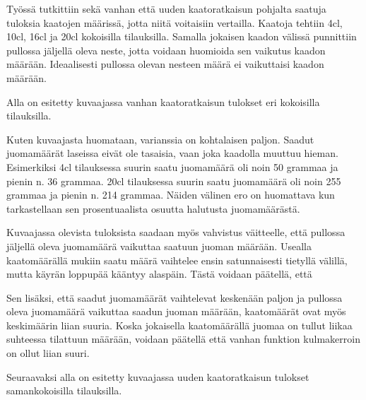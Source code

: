 Työssä tutkittiin sekä vanhan että uuden kaatoratkaisun pohjalta saatuja tuloksia kaatojen määrissä, jotta niitä voitaisiin vertailla. Kaatoja tehtiin 4cl, 10cl, 16cl ja 20cl kokoisilla tilauksilla. Samalla jokaisen kaadon välissä punnittiin pullossa jäljellä oleva neste, jotta voidaan huomioida sen vaikutus kaadon määrään. Ideaalisesti pullossa olevan nesteen määrä ei vaikuttaisi kaadon määrään.

Alla on esitetty kuvaajassa vanhan kaatoratkaisun tulokset eri kokoisilla tilauksilla.


Kuten kuvaajasta huomataan, varianssia on kohtalaisen paljon. Saadut juomamäärät laseissa eivät ole tasaisia, vaan joka kaadolla muuttuu hieman. Esimerkiksi 4cl tilauksessa suurin saatu juomamäärä oli noin 50 grammaa ja pienin n. 36 grammaa. 20cl tilauksessa suurin saatu juomamäärä oli noin 255 grammaa ja pienin n. 214 grammaa. Näiden välinen ero on huomattava kun tarkastellaan sen prosentuaalista osuutta halutusta juomamäärästä.

Kuvaajassa olevista tuloksista saadaan myös vahvistus väitteelle, että pullossa jäljellä oleva juomamäärä vaikuttaa saatuun juoman määrään. Usealla kaatomäärällä mukiin saatu määrä vaihtelee ensin satunnaisesti tietyllä välillä, mutta käyrän loppupää kääntyy alaspäin. Tästä voidaan päätellä, että

Sen lisäksi, että saadut juomamäärät vaihtelevat keskenään paljon ja pullossa oleva juomamäärä vaikuttaa saadun juoman määrään, kaatomäärät ovat myös keskimäärin liian suuria. Koska jokaisella kaatomäärällä juomaa on tullut liikaa suhteessa tilattuun määrään, voidaan päätellä että vanhan funktion kulmakerroin on ollut liian suuri.

Seuraavaksi alla on esitetty kuvaajassa uuden kaatoratkaisun tulokset samankokoisilla tilauksilla.
